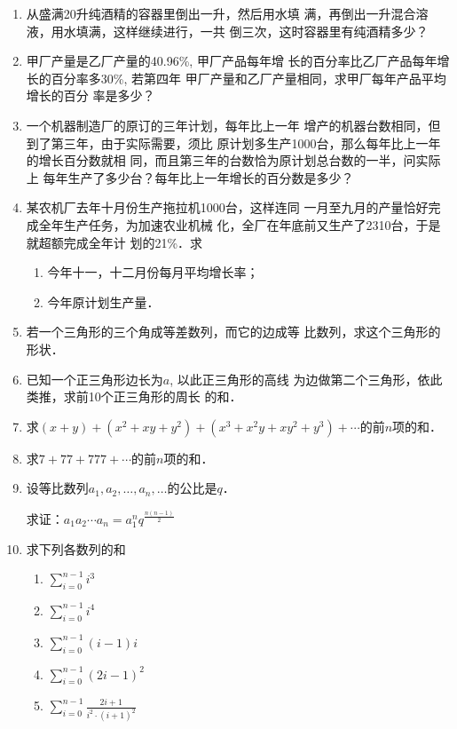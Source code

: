 \begin{enumerate}
\item 从盛满20升纯酒精的容器里倒出一升，然后用水填
满，再倒出一升混合溶液，用水填满，这样继续进行，一共
倒三次，这时容器里有纯酒精多少？
\item 甲厂产量是乙厂产量的40.96\%, 甲厂产品每年增
长的百分率比乙厂产品每年增长的百分率多30\%, 若第四年
甲厂产量和乙厂产量相同，求甲厂每年产品平均增长的百分
率是多少？
\item 一个机器制造厂的原订的三年计划，每年比上一年
增产的机器台数相同，但到了第三年，由于实际需要，须比
原计划多生产1000台，那么每年比上一年的增长百分数就相
同，而且第三年的台数恰为原计划总台数的一半，问实际上
每年生产了多少台？每年比上一年增长的百分数是多少？

\item 某农机厂去年十月份生产拖拉机1000台，这样连同
一月至九月的产量恰好完成全年生产任务，为加速农业机械
化，全厂在年底前又生产了2310台，于是就超额完成全年计
划的21\%．求
\begin{enumerate}
    \item 今年十一，十二月份每月平均增长率；
    \item 今年原计划生产量．
\end{enumerate}

\item 若一个三角形的三个角成等差数列，而它的边成等
比数列，求这个三角形的形状．
\item 已知一个正三角形边长为$a$, 以此正三角形的高线
为边做第二个三角形，依此类推，求前10个正三角形的周长
的和．
\item 求$(x+y)+(x^2+xy+y^2)+(x^3+x^2y+xy^2+y^3)+\cdots$的前$n$项的和．
\item 求$7+77+777+\cdots$的前$n$项的和．

\item 设等比数列$a_1,a_2,\ldots,a_n,\ldots$的公比是$q$．

求证：$a_1a_2\cdots a_n=a^n_1q^{\tfrac{n(n-1)}{2}}$

\item 求下列各数列的和
\begin{multicols}{2}
\begin{enumerate}
    \item $\displaystyle \sum^{n-1}_{i=0} i^3$
    \item $\displaystyle \sum^{n-1}_{i=0} i^4$
    \item $\displaystyle \sum^{n-1}_{i=0} (i-1)i$
    \item $\displaystyle \sum^{n-1}_{i=0} (2i-1)^2$
    \item $\displaystyle \sum^{n-1}_{i=0} \frac{2i+1}{i^2\cdot (i+1)^2}$
\end{enumerate}
\end{multicols}


\end{enumerate}
